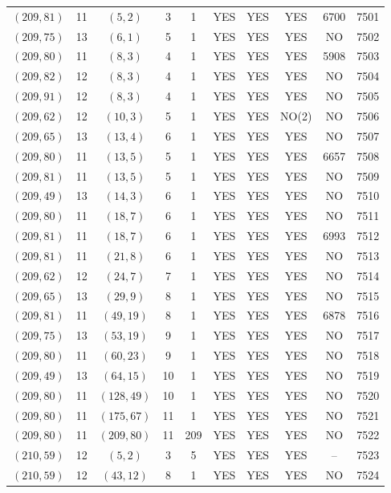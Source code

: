 \begin{longtable}{|c|c|c|c|c|c|c|c|c|c|}
$(209, 81)$ & 11 & $(5, 2)$ & 3 & 1 & YES & YES & YES & 6700 & 7501\\
$(209, 75)$ & 13 & $(6, 1)$ & 5 & 1 & YES & YES & YES & NO & 7502\\
$(209, 80)$ & 11 & $(8, 3)$ & 4 & 1 & YES & YES & YES & 5908 & 7503\\
$(209, 82)$ & 12 & $(8, 3)$ & 4 & 1 & YES & YES & YES & NO & 7504\\
$(209, 91)$ & 12 & $(8, 3)$ & 4 & 1 & YES & YES & YES & NO & 7505\\
$(209, 62)$ & 12 & $(10, 3)$ & 5 & 1 & YES & YES & NO(2) & NO & 7506\\
$(209, 65)$ & 13 & $(13, 4)$ & 6 & 1 & YES & YES & YES & NO & 7507\\
$(209, 80)$ & 11 & $(13, 5)$ & 5 & 1 & YES & YES & YES & 6657 & 7508\\
$(209, 81)$ & 11 & $(13, 5)$ & 5 & 1 & YES & YES & YES & NO & 7509\\
$(209, 49)$ & 13 & $(14, 3)$ & 6 & 1 & YES & YES & YES & NO & 7510\\
$(209, 80)$ & 11 & $(18, 7)$ & 6 & 1 & YES & YES & YES & NO & 7511\\
$(209, 81)$ & 11 & $(18, 7)$ & 6 & 1 & YES & YES & YES & 6993 & 7512\\
$(209, 81)$ & 11 & $(21, 8)$ & 6 & 1 & YES & YES & YES & NO & 7513\\
$(209, 62)$ & 12 & $(24, 7)$ & 7 & 1 & YES & YES & YES & NO & 7514\\
$(209, 65)$ & 13 & $(29, 9)$ & 8 & 1 & YES & YES & YES & NO & 7515\\
$(209, 81)$ & 11 & $(49, 19)$ & 8 & 1 & YES & YES & YES & 6878 & 7516\\
$(209, 75)$ & 13 & $(53, 19)$ & 9 & 1 & YES & YES & YES & NO & 7517\\
$(209, 80)$ & 11 & $(60, 23)$ & 9 & 1 & YES & YES & YES & NO & 7518\\
$(209, 49)$ & 13 & $(64, 15)$ & 10 & 1 & YES & YES & YES & NO & 7519\\
$(209, 80)$ & 11 & $(128, 49)$ & 10 & 1 & YES & YES & YES & NO & 7520\\
$(209, 80)$ & 11 & $(175, 67)$ & 11 & 1 & YES & YES & YES & NO & 7521\\
$(209, 80)$ & 11 & $(209, 80)$ & 11 & 209 & YES & YES & YES & NO & 7522\\
$(210, 59)$ & 12 & $(5, 2)$ & 3 & 5 & YES & YES & YES & -- & 7523\\
$(210, 59)$ & 12 & $(43, 12)$ & 8 & 1 & YES & YES & YES & NO & 7524\\

\end{longtable}

